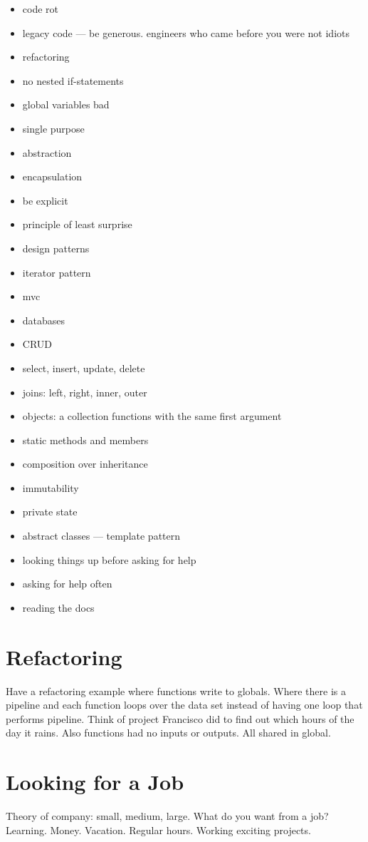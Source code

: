 \begin{itemize}
  \item code rot
  \item legacy code --- be generous. engineers who came before you were not idiots
  \item refactoring
  \item no nested if-statements
  \item global variables bad
  \item single purpose
  \item abstraction
  \item encapsulation
  \item be explicit
  \item principle of least surprise

  \item design patterns
  \item iterator pattern
  \item mvc
  \item databases
  \item CRUD
  \item select, insert, update, delete
  \item joins: left, right, inner, outer

  \item objects: a collection functions with the same first argument
  \item static methods and members
  \item composition over inheritance
  \item immutability
  \item private state
  \item abstract classes --- template pattern
  \item looking things up before asking for help
  \item asking for help often
  \item reading the docs
\end{itemize}

\section{Refactoring} Have a refactoring example where functions write to globals. Where there is a pipeline and each function loops over the data set instead of having one loop that performs pipeline. Think of project Francisco did to find out which hours of the day it rains. Also functions had no inputs or outputs. All shared in global.

\section{Looking for a Job}
Theory of company: small, medium, large. What do you want from a job? Learning. Money. Vacation. Regular hours. Working exciting projects.

